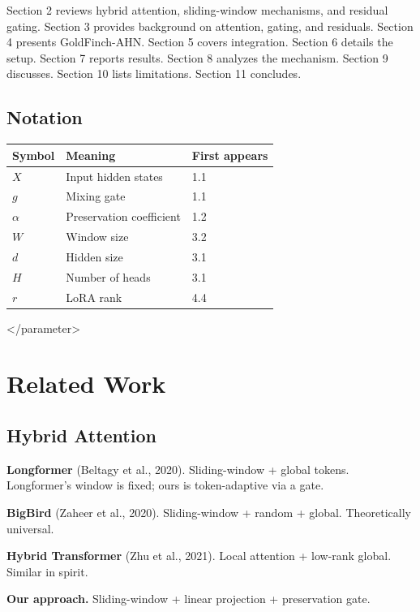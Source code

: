 Section 2 reviews hybrid attention, sliding-window mechanisms, and residual 
gating. Section 3 provides background on attention, gating, and residuals. 
Section 4 presents GoldFinch-AHN. Section 5 covers integration. Section 6 
details the setup. Section 7 reports results. Section 8 analyzes the 
mechanism. Section 9 discusses. Section 10 lists limitations. Section 11 
concludes.



\subsection{Notation}

\begin{table}[H]
\centering
\small
\begin{tabular}{lll}
\toprule
\textbf{Symbol} & \textbf{Meaning} & \textbf{First appears} \\
\midrule
$X$ & Input hidden states & 1.1 \\
$g$ & Mixing gate & 1.1 \\
$\alpha$ & Preservation coefficient & 1.2 \\
$W$ & Window size & 3.2 \\
$d$ & Hidden size & 3.1 \\
$H$ & Number of heads & 3.1 \\
$r$ & LoRA rank & 4.4 \\
\bottomrule
\end{tabular}
\end{table}
</parameter>




\section{Related Work}

\subsection{Hybrid Attention}

\textbf{Longformer} (Beltagy et al., 2020). Sliding-window + global tokens. 
Longformer's window is fixed; ours is token-adaptive via a gate.

\textbf{BigBird} (Zaheer et al., 2020). Sliding-window + random + global. 
Theoretically universal.

\textbf{Hybrid Transformer} (Zhu et al., 2021). Local attention + low-rank 
global. Similar in spirit.

\textbf{Our approach.} Sliding-window + linear projection + preservation gate.

